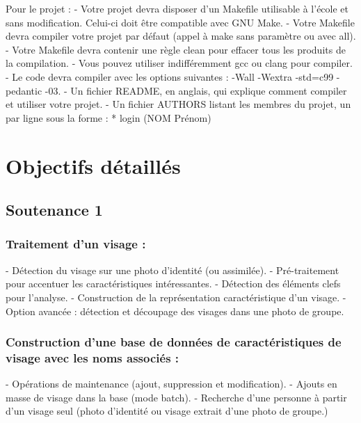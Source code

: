 \documentclass[12pt,a4paper]{article}
\begin{document}
Pour le projet :
\newline
- Votre projet devra disposer d'un Makefile utilisable à l'école et sans modification. Celui-ci doit être compatible avec GNU Make.
\newline
- Votre Makefile devra compiler votre projet par défaut (appel à make sans paramètre ou avec all).
\newline
- Votre Makefile devra contenir une règle clean pour effacer tous les produits de la compilation.
\newline
- Vous pouvez utiliser indifféremment gcc ou clang pour compiler.
\newline
- Le code devra compiler avec les options suivantes : -Wall -Wextra -std=c99 -pedantic -03.
\newline
- Un fichier README, en anglais, qui explique comment compiler et utiliser votre projet.
\newline
- Un fichier AUTHORS listant les membres du projet, un par ligne sous la forme :
\newline
* login (NOM Prénom)

\section{Objectifs détaillés}
\subsection{Soutenance 1}
\subsubsection{Traitement d'un visage :}
- Détection du visage sur une photo d'identité (ou assimilée).
\newline
- Pré-traitement pour accentuer les caractéristiques intéressantes.
\newline
- Détection des éléments clefs pour l'analyse.
\newline
- Construction de la représentation caractéristique d'un visage.
\newline
- Option avancée : détection et découpage des visages dans une photo de groupe.

\subsubsection{Construction d'une base de données de caractéristiques de visage avec les noms associés :}
- Opérations de maintenance (ajout, suppression et modification).
\newline
- Ajouts en masse de visage dans la base (mode batch).
\newline
- Recherche d'une personne à partir d'un visage seul (photo d'identité ou visage extrait d'une photo de groupe.)
\end{document}
